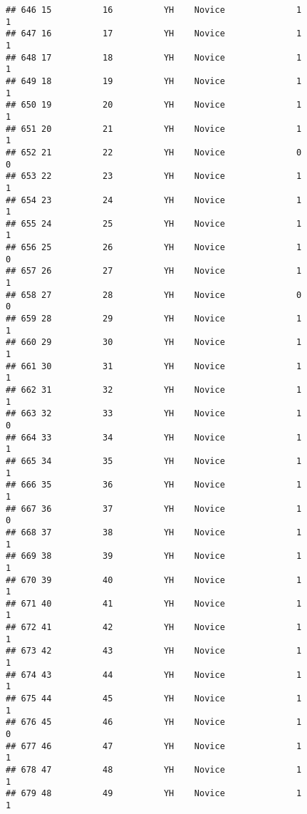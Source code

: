 \documentclass[
]{article}
\begin{document}
\begin{verbatim}
## 646 15          16          YH    Novice              1                 1
## 647 16          17          YH    Novice              1                 1
## 648 17          18          YH    Novice              1                 1
## 649 18          19          YH    Novice              1                 1
## 650 19          20          YH    Novice              1                 1
## 651 20          21          YH    Novice              1                 1
## 652 21          22          YH    Novice              0                 0
## 653 22          23          YH    Novice              1                 1
## 654 23          24          YH    Novice              1                 1
## 655 24          25          YH    Novice              1                 1
## 656 25          26          YH    Novice              1                 0
## 657 26          27          YH    Novice              1                 1
## 658 27          28          YH    Novice              0                 0
## 659 28          29          YH    Novice              1                 1
## 660 29          30          YH    Novice              1                 1
## 661 30          31          YH    Novice              1                 1
## 662 31          32          YH    Novice              1                 1
## 663 32          33          YH    Novice              1                 0
## 664 33          34          YH    Novice              1                 1
## 665 34          35          YH    Novice              1                 1
## 666 35          36          YH    Novice              1                 1
## 667 36          37          YH    Novice              1                 0
## 668 37          38          YH    Novice              1                 1
## 669 38          39          YH    Novice              1                 1
## 670 39          40          YH    Novice              1                 1
## 671 40          41          YH    Novice              1                 1
## 672 41          42          YH    Novice              1                 1
## 673 42          43          YH    Novice              1                 1
## 674 43          44          YH    Novice              1                 1
## 675 44          45          YH    Novice              1                 1
## 676 45          46          YH    Novice              1                 0
## 677 46          47          YH    Novice              1                 1
## 678 47          48          YH    Novice              1                 1
## 679 48          49          YH    Novice              1                 1

\end{verbatim}
\end{document}
